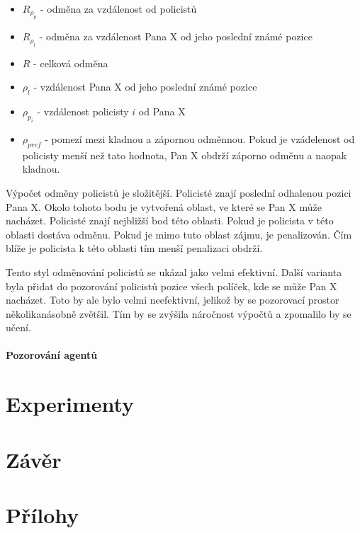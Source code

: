 \begin{itemize}
  \item $R_{\rho_p}$ - odměna za vzdálenost od policistů
  \item $R_{\rho_l}$ - odměna za vzdálenost Pana X od jeho poslední známé pozice
  \item $R$ - celková odměna
  \item $\rho_l$ - vzdálenost Pana X od jeho poslední známé pozice
  \item $\rho_{p_i}$ - vzdálenost policisty $i$ od Pana X
  \item $\rho_{pref}$ - pomezí mezi kladnou a zápornou odměnnou.
  Pokud je vzádelenost od policisty menší než tato hodnota, Pan X obdrží záporno odměnu a naopak kladnou.
\end{itemize}

Výpočet odměny policistů je složitější.
Policisté znají poslední odhalenou pozici Pana X.
Okolo tohoto bodu je vytvořená oblast, ve které se Pan X může nacházet.
Policisté znají nejbližší bod této oblasti.
Pokud je policista v této oblasti dostáva odměnu.
Pokud je mimo tuto oblast zájmu, je penalizován.
Čím blíže je policista k této oblasti tím menší penalizaci obdrží.

Tento styl odměnování policistů se ukázal jako velmi efektivní.
Další varianta byla přidat do pozorování policistů pozice všech políček, kde se může Pan X nacházet.
Toto by ale bylo velmi neefektivní, jelikož by se pozorovací prostor několikanásobně zvětšil.
Tím by se zvýšila náročnost výpočtů a zpomalilo by se učení.

\subsubsection*{Pozorování agentů}

\chapter{Experimenty}
\label{experimenty}
\chapter{Závěr}
\label{zaver}
\chapter{Přílohy}
\label{prilohy}




%
